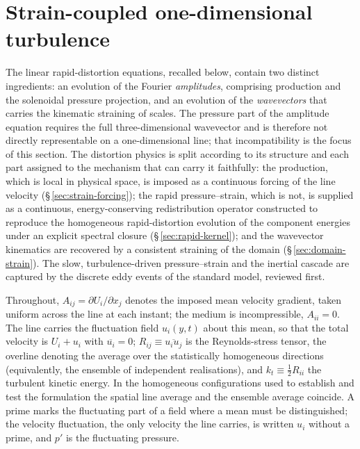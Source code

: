 \documentclass[lineno]{JFM-FLM_Au}
\begin{document}
\section{Strain-coupled one-dimensional turbulence}\label{sec:formulation}

The linear rapid-distortion equations, recalled below, contain two
distinct ingredients: an evolution of the Fourier \emph{amplitudes},
comprising production and the solenoidal pressure projection, and an
evolution of the \emph{wavevectors} that carries the kinematic straining
of scales. The pressure part of the amplitude equation requires the full
three-dimensional wavevector and is therefore not directly representable
on a one-dimensional line; that incompatibility is the focus of this section.
The distortion physics is split according to its structure and each part
assigned to the mechanism that can carry it faithfully: the production,
which is local in physical space, is imposed as a continuous forcing of
the line velocity (\S\,\ref{sec:strain-forcing}); the rapid
pressure--strain, which is not, is supplied as a continuous,
energy-conserving redistribution operator constructed to reproduce the
homogeneous rapid-distortion evolution of the component energies under an
explicit spectral closure (\S\,\ref{sec:rapid-kernel}); and the wavevector
kinematics are recovered by a consistent straining of the domain
(\S\,\ref{sec:domain-strain}). The slow, turbulence-driven pressure--strain and the inertial cascade
are captured by the discrete eddy events of the standard model, reviewed first.

Throughout, $A_{ij}=\partial U_i/\partial x_j$ denotes the imposed mean
velocity gradient, taken uniform across the line at each instant; the
medium is incompressible, $A_{ii}=0$. The line carries the fluctuation
field $u_i(y,t)$ about this mean, so that the total velocity is
$U_i+u_i$ with $\overline{u_i}=0$; $R_{ij}\equiv\overline{u_iu_j}$ is the
Reynolds-stress tensor, the overline denoting the average over the
statistically homogeneous directions (equivalently, the ensemble of
independent realisations), and $k_t\equiv\tfrac12R_{ii}$ the turbulent
kinetic energy. In the homogeneous configurations used to establish and
test the formulation the spatial line average and the ensemble average
coincide. A prime marks the fluctuating part of a field where a mean
must be distinguished; the velocity fluctuation, the only velocity the
line carries, is written $u_i$ without a prime, and $p'$ is the
fluctuating pressure.
\end{document}
